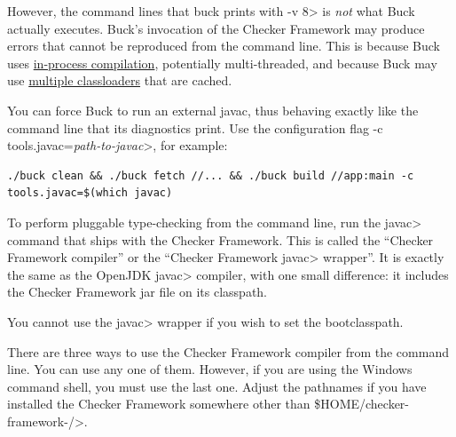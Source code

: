 However, the command lines that buck prints with \<-v 8> is \emph{not} what
Buck actually executes.  Buck's invocation of the Checker Framework may
produce errors that cannot be reproduced from the command line.  This is
because Buck uses
\href{https://github.com/facebook/buck/blob/main/src/com/facebook/buck/jvm/java/Jsr199Javac.java}{in-process
  compilation}, potentially multi-threaded, and because Buck may use
\href{https://github.com/facebook/buck/blob/main/src/com/facebook/buck/util/ClassLoaderCache.java}{multiple
  classloaders} that are cached.

You can force Buck to run an external javac, thus behaving exactly like the
command line that its diagnostics print.  Use the configuration flag \<-c
tools.javac=\emph{path-to-javac}>, for example:

\begin{Verbatim}
./buck clean && ./buck fetch //... && ./buck build //app:main -c tools.javac=$(which javac)
\end{Verbatim}


\label{javac-installation}      %

To perform pluggable type-checking from the command line, run the \<javac>
command that ships with the Checker Framework.  This is called the
``Checker Framework compiler'' or the ``Checker Framework \<javac> wrapper''.
It is exactly the same as the OpenJDK
\<javac> compiler, with one small difference:  it includes the Checker
Framework jar file on its classpath.

You cannot use the \<javac> wrapper if you wish to set the bootclasspath.

There are three ways to use the Checker Framework compiler from the command
line.  You can use any
one of them.  However, if you are using the Windows command shell, you must
use the last one.
Adjust the pathnames if you have installed the Checker Framework somewhere
other than \<\${HOME}/checker-framework-\ReleaseVersion{}/>.


